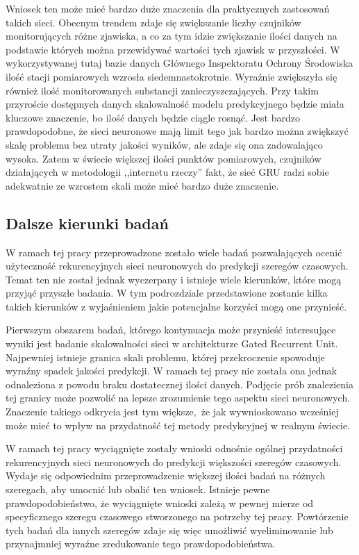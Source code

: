 \documentclass[10pt,a4paper]{article}
\begin{document}
Wniosek ten może mieć bardzo duże znaczenia dla praktycznych zastosowań takich sieci. Obecnym trendem zdaje się zwiększanie liczby czujników monitorujących różne zjawiska, a co za tym idzie zwiększanie ilości danych na podstawie których można przewidywać wartości tych zjawisk w przyszłości. W wykorzystywanej tutaj bazie danych Głównego Inspektoratu Ochrony Środowiska ilość stacji pomiarowych wzrosła siedemnastokrotnie. Wyraźnie zwiększyła się również ilość monitorowanych substancji zanieczyszczających. Przy takim przyroście dostępnych danych skalowalność modelu predykcyjnego będzie miała kluczowe znaczenie, bo ilość danych będzie ciągle rosnąć. Jest bardzo prawdopodobne, że sieci neuronowe mają limit tego jak bardzo można zwiększyć skalę problemu bez utraty jakości wyników, ale zdaje się ona zadowalająco wysoka. Zatem w świecie większej ilości punktów pomiarowych, czujników działających w metodologii ,,internetu rzeczy'' fakt, że sieć GRU radzi sobie adekwatnie ze wzrostem skali może mieć bardzo duże znaczenie.

\subsection{Dalsze kierunki badań}
W ramach tej pracy przeprowadzone zostało wiele badań pozwalających ocenić użyteczność rekurencyjnych sieci neuronowych do predykcji szeregów czasowych. Temat ten nie został jednak wyczerpany i istnieje wiele kierunków, które mogą przyjąć przyszłe badania. W tym podrozdziale przedstawione zostanie kilka takich kierunków z wyjaśnieniem jakie potencjalne korzyści mogą one przynieść. 

Pierwszym obszarem badań, którego kontynuacja może przynieść interesujące wyniki jest badanie skalowalności sieci w architekturze Gated Recurrent Unit. Najpewniej istnieje granica skali problemu, której przekroczenie spowoduje wyraźny spadek jakości predykcji. W ramach tej pracy nie została ona jednak odnaleziona z powodu braku dostatecznej ilości danych. Podjęcie prób znalezienia tej granicy może pozwolić na lepsze zrozumienie tego aspektu sieci neuronowych. Znaczenie takiego odkrycia jest tym większe, że jak wywnioskowano wcześniej może mieć to wpływ na przydatność tej metody predykcyjnej w realnym świecie. 

W ramach tej pracy wyciągnięte zostały wnioski odnośnie ogólnej przydatności rekurencyjnych sieci neuronowych do predykcji większości szeregów czasowych. Wydaje się odpowiednim przeprowadzenie większej ilości badań na różnych szeregach, aby umocnić lub obalić ten wniosek. Istnieje pewne prawdopodobieństwo, że wyciągnięte wnioski zależą w pewnej mierze od specyficznego szeregu czasowego stworzonego na potrzeby tej pracy. Powtórzenie tych badań dla innych szeregów zdaje się więc umożliwić wyeliminowanie lub przynajmniej wyraźne zredukowanie tego prawdopodobieństwa. 
\end{document}
